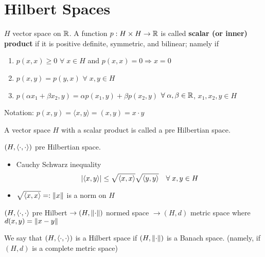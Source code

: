 
\section{Hilbert Spaces}

\begin{definition}
    \(H\) vector space on \(\mathbb{R}\). A function \(p:H \times H \to \mathbb{R}\) is called \textbf{scalar (or inner) product} if it is positive definite, symmetric, and bilinear; namely if 
    \begin{enumerate}
        \item \(p(x, x) \geq 0\) \(\forall \; x \in H\) and \(p(x, x) = 0 \Rightarrow x=0\)
        \item \(p(x, y) = p(y, x)\) \(\forall \; x, y \in H\)
        \item \(p(\alpha x_1 + \beta x_2, y) = \alpha p (x_1, y) + \beta p(x_2, y)\) \(\forall \; \alpha, \beta \in \mathbb{R}\), \(x_1, x_2, y \in H\)
    \end{enumerate}
\end{definition}

Notation: \(p(x, y) = \langle x, y \rangle = (x, y) = x \cdot y\)

\begin{definition}
    A vector space \(H\) with a scalar product is called a pre Hilbertian space.
\end{definition}

\begin{proposition}
    \((H, \langle \cdot,\cdot \rangle )\) pre Hilbertian space.
    \begin{itemize}
        \item Cauchy Schwarz inequality \[
            \abs{\langle x, y\rangle} \leq \sqrt{\langle x, x\rangle} \sqrt{\langle y, y\rangle } \quad \forall \; x, y \in H
        \]
        \item \(\sqrt{\langle x, x \rangle} =: \norm{x}\) is a norm on \(H\)
    \end{itemize}
\end{proposition}

\((H, \langle \cdot,\cdot \rangle \) pre Hilbert \(\to (H, \norm{\cdot})\) normed space \(\to (H, d)\) metric space where \(d(x, y) = \norm{x-y}\)

\begin{definition}
    We say that \((H, \langle \cdot,\cdot \rangle)\) is a Hilbert space if \((H, \norm{\cdot})\) is a Banach space. (namely, if \((H, d)\) is a complete metric space)
\end{definition}

